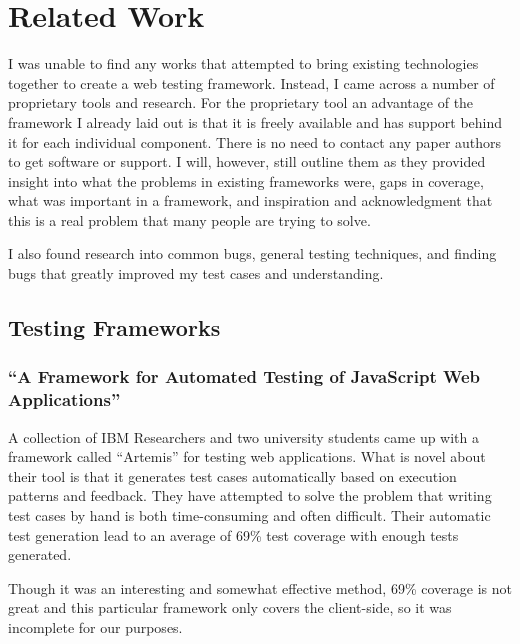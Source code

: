 \documentclass[11pt]{article}
\begin{document}
\section{Related Work}
I was unable to find any works that attempted to bring existing technologies together to create a web testing framework. Instead, I came across a number of proprietary tools and research. For the proprietary tool an advantage of the framework I already laid out is that it is freely available and has support behind it for each individual component. There is no need to contact any paper authors to get software or support. I will, however, still outline them as they provided insight into what the problems in existing frameworks were, gaps in coverage, what was important in a framework, and inspiration and acknowledgment that this is a real problem that many people are trying to solve.

I also found research into common bugs, general testing techniques, and finding bugs that greatly improved my test cases and understanding.

\subsection{Testing Frameworks}

\subsubsection{``A Framework for Automated Testing of JavaScript Web Applications'' \cite{FrameworkForAutomatedTesting}}
A collection of IBM Researchers and two university students came up with a framework called ``Artemis'' for testing web applications. What is novel about their tool is that it generates test cases automatically based on execution patterns and feedback. They have attempted to solve the problem that writing test cases by hand is both time-consuming and often difficult. Their automatic test generation lead to an average of 69\% test coverage with enough tests generated.

Though it was an interesting and somewhat effective method, 69\% coverage is not great and this particular framework only covers the client-side, so it was incomplete for our purposes.
\end{document}
